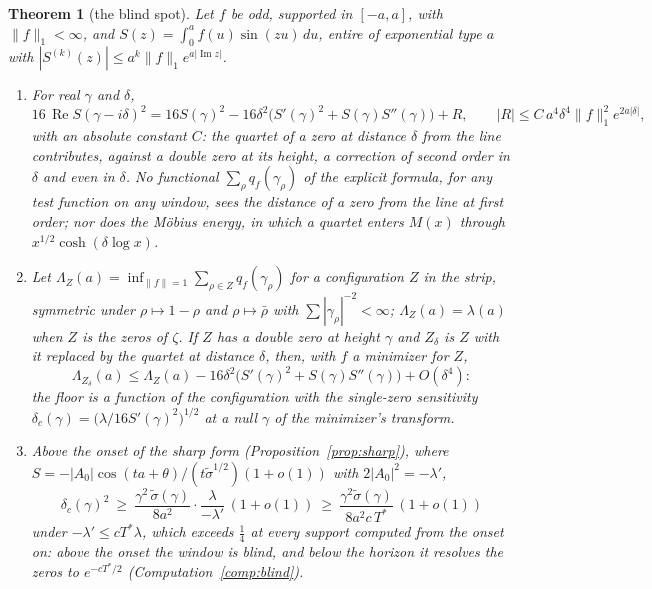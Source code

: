 \documentclass[11pt]{article}
\newtheorem{theorem}{Theorem}[section]
\theoremstyle{definition}
\theoremstyle{remark}
\DeclareMathOperator{\Ree}{Re}
\DeclareMathOperator{\Imm}{Im}
\newcommand{\Tst}{T^{*}}
\begin{document}
\begin{theorem}[the blind spot]\label{thm:blind}
Let $f$ be odd, supported in $[-a,a]$, with $\|f\|_1<\infty$, and $S(z)=\int_0^af(u)\sin(zu)\,du$, entire of exponential type $a$ with $|S^{(k)}(z)|\le a^k\|f\|_1e^{a|\Imm z|}$.
\begin{enumerate}
\item[(i)] For real $\gamma$ and $\delta$,
\[
16\,\Ree S(\gamma-i\delta)^2=16S(\gamma)^2-16\delta^2\big(S'(\gamma)^2+S(\gamma)S''(\gamma)\big)+R,\qquad |R|\le C\,a^4\delta^4\|f\|_1^2e^{2a|\delta|},
\]
with an absolute constant $C$: the quartet of a zero at distance $\delta$ from the line contributes, against a double zero at its height, a correction of second order in $\delta$ and even in $\delta$. No functional $\sum_\rho q_f(\gamma_\rho)$ of the explicit formula, for any test function on any window, sees the distance of a zero from the line at first order; nor does the M\"obius energy, in which a quartet enters $M(x)$ through $x^{1/2}\cosh(\delta\log x)$.
\item[(ii)] Let $\Lambda_Z(a)=\inf_{\|f\|=1}\sum_{\rho\in Z}q_f(\gamma_\rho)$ for a configuration $Z$ in the strip, symmetric under $\rho\mapsto1-\rho$ and $\rho\mapsto\bar\rho$ with $\sum|\gamma_\rho|^{-2}<\infty$; $\Lambda_Z(a)=\lambda(a)$ when $Z$ is the zeros of $\zeta$. If $Z$ has a double zero at height $\gamma$ and $Z_\delta$ is $Z$ with it replaced by the quartet at distance $\delta$, then, with $f$ a minimizer for $Z$,
\[
\Lambda_{Z_\delta}(a)\le\Lambda_Z(a)-16\delta^2\big(S'(\gamma)^2+S(\gamma)S''(\gamma)\big)+O(\delta^4):
\]
the floor is a function of the configuration with the single-zero sensitivity $\delta_c(\gamma)=\big(\lambda/16S'(\gamma)^2\big)^{1/2}$ at a null $\gamma$ of the minimizer's transform.
\item[(iii)] Above the onset of the sharp form (Proposition~\ref{prop:sharp}), where $S=-|A_0|\cos(ta+\theta)/(t\tilde\sigma^{1/2})(1+o(1))$ with $2|A_0|^2=-\lambda'$,
\[
\delta_c(\gamma)^2\ \ge\ \frac{\gamma^2\,\tilde\sigma(\gamma)}{8a^2}\cdot\frac{\lambda}{-\lambda'}\,(1+o(1))\ \ge\ \frac{\gamma^2\tilde\sigma(\gamma)}{8a^2c\,\Tst}\,(1+o(1))
\]
under $-\lambda'\le c\Tst\lambda$, which exceeds $\tfrac14$ at every support computed from the onset on: above the onset the window is blind, and below the horizon it resolves the zeros to $e^{-c\Tst/2}$ (Computation~\ref{comp:blind}).
\end{enumerate}
\end{theorem}
\end{document}
